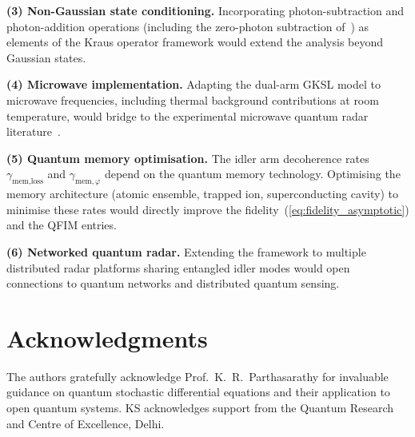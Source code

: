 \documentclass[journal]{IEEEtran}
\begin{document}
\textbf{(3) Non-Gaussian state conditioning.} Incorporating photon-subtraction and photon-addition operations (including the zero-photon subtraction of~\cite{zhao2025quantum}) as elements of the Kraus operator framework would extend the analysis beyond Gaussian states.

\textbf{(4) Microwave implementation.} Adapting the dual-arm GKSL model to microwave frequencies, including thermal background contributions at room temperature, would bridge to the experimental microwave quantum radar literature~\cite{barzanjeh2015microwave,chang2019quantum}.

\textbf{(5) Quantum memory optimisation.} The idler arm decoherence rates $\gamma_{\text{mem,loss}}$ and $\gamma_{\text{mem},\varphi}$ depend on the quantum memory technology. Optimising the memory architecture (atomic ensemble, trapped ion, superconducting cavity) to minimise these rates would directly improve the fidelity~(\ref{eq:fidelity_asymptotic}) and the QFIM entries.

\textbf{(6) Networked quantum radar.} Extending the framework to multiple distributed radar platforms sharing entangled idler modes would open connections to quantum networks and distributed quantum sensing.


\section*{Acknowledgments}

The authors gratefully acknowledge Prof.~K.~R.~Parthasarathy for invaluable guidance on quantum stochastic differential equations and their application to open quantum systems. KS acknowledges support from the Quantum Research and Centre of Excellence, Delhi.
\end{document}
